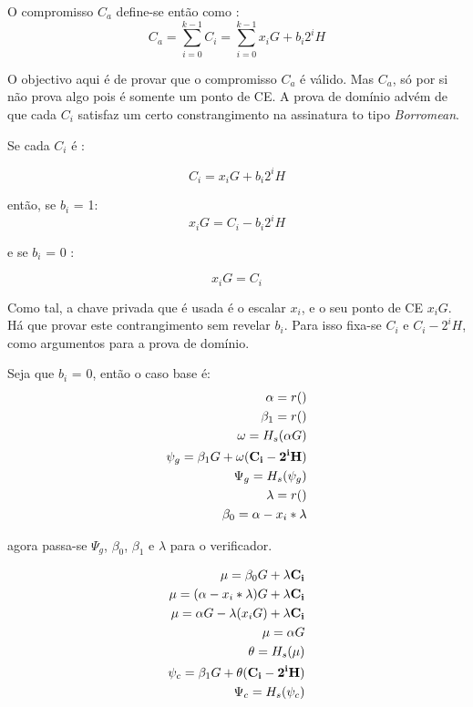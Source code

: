 O compromisso $C_a$ define-se então como :\vspace{.175cm}
\[C_{a} = \sum_{i=0}^{k-1} C_{i} = \sum_{i=0}^{k-1} x_i G + b_i 2^i H \]
\vspace{.175cm}

O objectivo aqui é de provar que o compromisso $C_a$ é válido. Mas $C_a$, só por si não prova algo pois é somente um ponto de CE. A prova de domínio advém de que cada $C_i$ satisfaz um certo constrangimento na assinatura to tipo {\em Borromean}. 

Se cada $C_i$ é :

\vspace{.175cm}
\[C_{i} = x_i G + b_i 2^i H \]
\vspace{.175cm}

então, se $b_i$ = 1:
\vspace{.175cm}
\[x_i G = C_{i} - b_i 2^i H \]
\vspace{.175cm}

e se $b_i$ = 0 :

\vspace{.175cm}
\[x_i G = C_{i} \]
\vspace{.175cm}

Como tal, a chave privada que é usada é o escalar $x_i$, e o seu ponto de CE $x_i G$. 
Há que provar este contrangimento sem revelar $b_i$. 
\newpage
Para isso fixa-se $C_i$ e $C_i - 2^i H$, como argumentos para a prova de domínio.

Seja que $b_i$ = 0, então o caso base é:
\begin{align*}
\alpha=r()\\
\beta_1=r()\\
\omega = H_s(\alpha G)\\
\psi_g = \beta_1 G + \omega (\bold{C_i - 2^i H})\\
\Psi_g = H_s(\psi_g)\\
\lambda = r()\\
\beta_0=\alpha-x_i*\lambda\\
\end{align*}

agora passa-se $\Psi_g$, $\beta_0$, $\beta_1$ e $\lambda$ para o verificador.  

\begin{align*}
\mu=\beta_0 G + \lambda \bold{C_i}\\
\mu= (\alpha-x_i*\lambda) G + \lambda \bold{C_i}\\
\mu= \alpha G-\lambda (x_i G) + \lambda \bold{C_i}\\ 
\mu= \alpha G\\
\theta= H_s(\mu)\\
\psi_c = \beta_1 G + \theta (\bold{C_i - 2^i H})\\
\Psi_c = H_s(\psi_c)\\
\end{align*}

